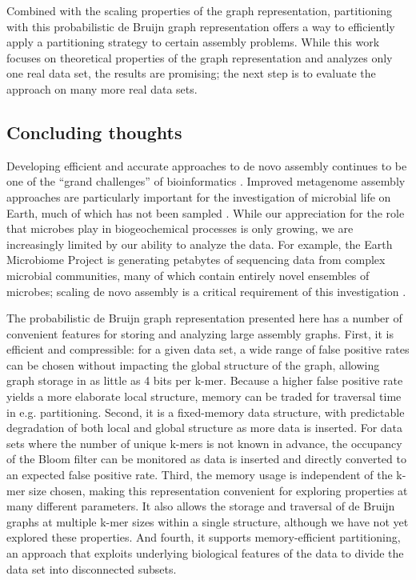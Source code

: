 \documentclass{pnastwo}
\begin{document}
\begin{article}
Combined with the scaling properties of the graph representation,
partitioning with this probabilistic de Bruijn graph representation
offers a way to efficiently apply a partitioning strategy to certain
assembly problems.  While this work focuses on theoretical properties
of the graph representation and analyzes only one real data set, the
results are promising; the next step is to evaluate the approach
on many more real data sets.

\subsection{Concluding thoughts}


Developing efficient and accurate approaches to de novo assembly
continues to be one of the ``grand challenges'' of bioinformatics
\cite{pubmed22147368}.  Improved metagenome assembly approaches are
particularly important for the investigation of microbial life on
Earth, much of which has not been sampled
\cite{terabasemetag,nrcbook}.  While our appreciation for the role
that microbes play in biogeochemical processes is only growing, we are
increasingly limited by our ability to analyze the data.  For example,
the Earth Microbiome Project is generating petabytes of sequencing
data from complex microbial communities, many of which contain
entirely novel ensembles of microbes; scaling de novo assembly is a
critical requirement of this investigation \cite{emp2010}.

The probabilistic de Bruijn graph representation presented here has a
number of convenient features for storing and analyzing large assembly
graphs.  First, it is efficient and compressible: for a given data
set, a wide range of false positive rates can be chosen without
impacting the global structure of the graph, allowing graph storage in
as little as 4 bits per k-mer.  Because a higher false positive rate
yields a more elaborate local structure, memory can be traded for
traversal time in e.g. partitioning.  Second, it is a fixed-memory
data structure, with predictable degradation of both local and global
structure as more data is inserted.  For data sets where the number of
unique k-mers is not known in advance, the occupancy of the Bloom
filter can be monitored as data is inserted and directly converted to
an expected false positive rate.  Third, the memory usage is
independent of the k-mer size chosen, making this representation
convenient for exploring properties at many different parameters.  It
also allows the storage and traversal of de Bruijn graphs at multiple
k-mer sizes within a single structure, although we have not yet
explored these properties.  And fourth, it supports memory-efficient
partitioning, an approach that exploits underlying biological features
of the data to divide the data set into disconnected subsets.


\end{article}
\end{document}
